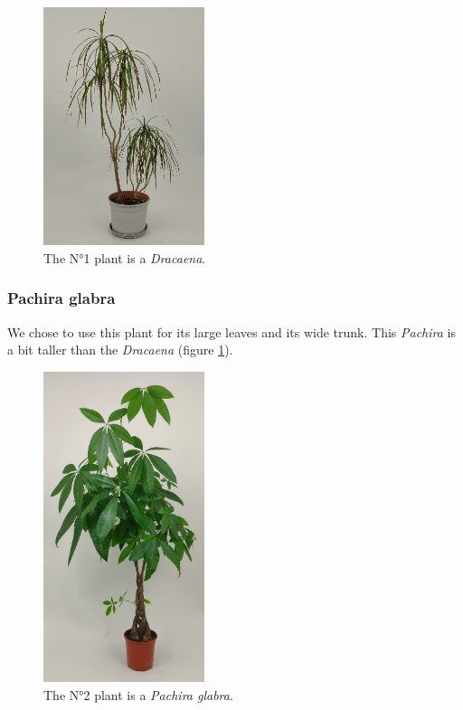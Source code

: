 \begin{figure}[h!]
    \centering
    \includegraphics[width=0.42\textwidth, angle=-90]{Images/small_plant.jpg}
    \caption{The N°1 plant is a \textit{Dracaena}.}
    
    \vspace{-0.5cm}
    \label{fig:small_plant}
    \vspace{0.2cm}
\end{figure}




\subsubsection{Pachira glabra}

We chose to use this plant for its large leaves and its wide trunk. This \textit{Pachira} is a bit taller than the \textit{Dracaena} (figure \ref{fig:small_plant}).
\begin{figure}[h!]
    \centering
    \includegraphics[width=0.42\textwidth, angle=-90]{Images/tall_plant_cropped.jpg}
    \caption{The N°2 plant is a \textit{Pachira glabra}.}
    
    \vspace{-0.5cm}
    \label{fig:tall_plant}
    \vspace{0.2cm}
\end{figure}


